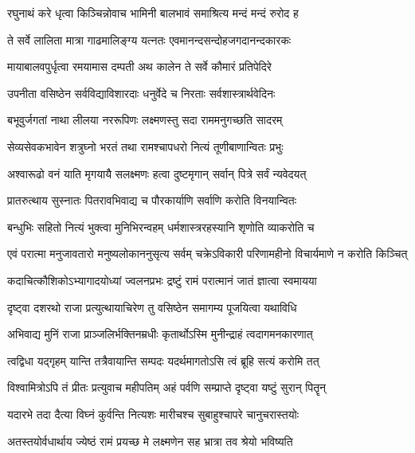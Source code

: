 \twolineshloka
{रघुनाथं करे धृत्वा किञ्चिन्नोवाच भामिनी}
{बालभावं समाश्रित्य मन्दं मन्दं रुरोद ह} %

\twolineshloka
{ते सर्वे लालिता मात्रा गाढमालिङ्ग्य यत्नतः}
{एवमानन्दसन्दोहजगदानन्दकारकः} %

\twolineshloka
{मायाबालवपुर्धृत्वा रमयामास दम्पती}
{अथ कालेन ते सर्वे कौमारं प्रतिपेदिरे} %

\twolineshloka
{उपनीता वसिष्ठेन सर्वविद्याविशारदाः}
{धनुर्वेदे च निरताः सर्वशास्त्रार्थवेदिनः} %

\twolineshloka
{बभूवुर्जगतां नाथा लीलया नररूपिणः}
{लक्ष्मणस्तु सदा राममनुगच्छति सादरम्} %

\twolineshloka
{सेव्यसेवकभावेन शत्रुघ्नो भरतं तथा}
{रामश्चापधरो नित्यं तूणीबाणान्वितः प्रभुः} %

\twolineshloka
{अश्वारूढो वनं याति मृगयायै सलक्ष्मणः}
{हत्वा दुष्टमृगान् सर्वान् पित्रे सर्वं न्यवेदयत्} %

\twolineshloka
{प्रातरुत्थाय सुस्नातः पितरावभिवाद्य च}
{पौरकार्याणि सर्वाणि करोति विनयान्वितः} %

\twolineshloka
{बन्धुभिः सहितो नित्यं भुक्त्वा मुनिभिरन्वहम्}
{धर्मशास्त्ररहस्यानि शृणोति व्याकरोति च} %

\twolineshloka
{एवं परात्मा मनुजावतारो मनुष्यलोकाननुसृत्य सर्वम्}
{चक्रेऽविकारी परिणामहीनो विचार्यमाणे न करोति किञ्चित्} %




\twolineshloka
{कदाचित्कौशिकोऽभ्यागादयोध्यां ज्वलनप्रभः}
{द्रष्टुं रामं परात्मानं जातं ज्ञात्वा स्वमायया} %

\twolineshloka
{दृष्ट्वा दशरथो राजा प्रत्युत्थायाचिरेण तु}
{वसिष्ठेन समागम्य पूजयित्वा यथाविधि} %

\twolineshloka
{अभिवाद्य मुनिं राजा प्राञ्जलिर्भक्तिनम्रधीः}
{कृतार्थोऽस्मि मुनीन्द्राहं त्वदागमनकारणात्} %

\twolineshloka
{त्वद्विधा यद्गृहम् यान्ति तत्रैवायान्ति सम्पदः}
{यदर्थमागतोऽसि त्वं ब्रूहि सत्यं करोमि तत्} %

\twolineshloka
{विश्वामित्रोऽपि तं प्रीतः प्रत्युवाच महीपतिम्}
{अहं पर्वणि सम्प्राप्ते दृष्ट्वा यष्टुं सुरान् पितॄन्} %

\twolineshloka
{यदारभे तदा दैत्या विघ्नं कुर्वन्ति नित्यशः}
{मारीचश्च सुबाहुश्चापरे चानुचरास्तयोः} %

\twolineshloka
{अतस्तयोर्वधार्थाय ज्येष्ठं रामं प्रयच्छ मे}
{लक्ष्मणेन सह भ्रात्रा तव श्रेयो भविष्यति} %

